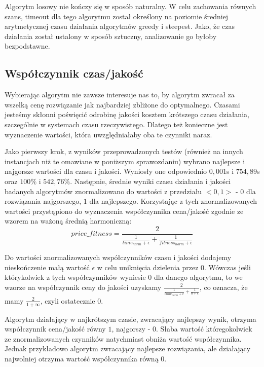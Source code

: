Algorytm losowy nie kończy się w sposób naturalny. W celu zachowania równych szans, timeout dla tego algorytmu został określony na poziomie średniej arytmetycznej czasu działania algorytmów greedy i steepest. Jako, że czas działania został ustalony w sposób sztuczny, analizowanie go byłoby bezpodstawne.

\subsection{Współczynnik czas/jakość}
Wybierając algorytm nie zawsze interesuje nas to, by algorytm zwracał za wszelką cenę rozwiązanie jak najbardziej zbliżone do optymalnego. Czasami jesteśmy skłonni poświęcić odrobinę jakości kosztem krótszego czasu działania, szczególnie w systemach czasu rzeczywistego. Dlatego też konieczne jest wyznaczenie wartości, która uwzględniałaby oba te czynniki naraz.

Jako pierwszy krok, z wyników przeprowadzonych testów (również na innych instancjach niż te omawiane w poniższym sprawozdaniu) wybrano najlepsze i najgorsze wartości dla czasu i jakości. Wyniosły one odpowiednio $0,001$s i $754,89$s oraz $100\%$ i $542,76\%$. Następnie, średnie wyniki czasu działania i jakości badanych algorytmów znormalizowano do wartości z przedziału $<0,1>$ - $0$ dla rozwiązania najgorszego, $1$ dla najlepszego. Korzystając z tych znormalizowanych wartości przystąpiono do wyznaczenia współczynnika cena/jakość zgodnie ze wzorem na ważoną średnią harmoniczną:
\begin{equation*}
price\_fitness = \frac{2}{\frac{1}{time_{norm} + \epsilon} + \frac{1}{fitness_{norm} + \epsilon} }
\end{equation*}

Do wartości znormalizowanych współczynników czasu i jakości dodajemy nieskończenie małą wartość $\epsilon$ w celu uniknięcia dzielenia przez 0. Wówczas jeśli którykolwiek z tych współczynników wyniesie $0$ dla danego algorytmu, to we wzorze na współczynnik ceny do jakości uzyskamy $\frac{2}{\frac{1}{time_{norm} + \epsilon} + \frac{1}{0 + \epsilon}}$, co oznacza, że mamy $\frac{2}{1 + \infty}$, czyli ostatecznie $0$.

Algorytm działający w najkrótszym czasie, zwracający najlepszy wynik, otrzyma współczynnik cena/jakość równy $1$, najgorszy - $0$. Słaba wartość któregokolwiek ze znormalizowanych czynników natychmiast obniża wartość współczynnika. Jednak przykładowo algorytm zwracający najlepsze rozwiązania, ale działający najwolniej otrzyma wartość współczynnika równą 0.

